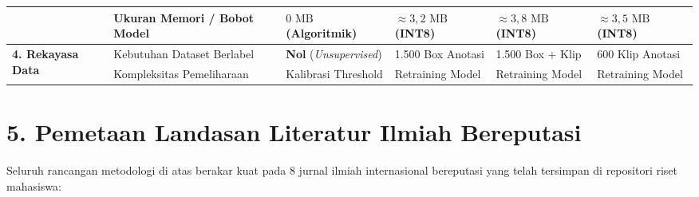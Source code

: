 \documentclass[10pt,a4paper]{article}
\providecommand{\text}[1]{\mbox{#1}}
\begin{document}
{\begin{center}
\begin{tabular}{|p{3.8cm}|p{4.2cm}|p{2.6cm}|p{2.4cm}|p{2.4cm}|p{2.4cm}|}
 & Ukuran Memori / Bobot Model & $0\text{ MB}$ (Algoritmik) & $\approx 3{,}2\text{ MB}$ (INT8) & $\approx 3{,}8\text{ MB}$ (INT8) & $\approx 3{,}5\text{ MB}$ (INT8) \\
\hline
\multirow{2}{*}{\textbf{4. Rekayasa Data}} 
 & Kebutuhan Dataset Berlabel & \textbf{Nol} (\textit{Unsupervised}) & 1.500 Box Anotasi & 1.500 Box + Klip & 600 Klip Anotasi \\
 & Kompleksitas Pemeliharaan & Kalibrasi Threshold & Retraining Model & Retraining Model & Retraining Model \\
\hline
\end{tabular}
\end{center}
}

\newpage


\section*{5. Pemetaan Landasan Literatur Ilmiah Bereputasi}

Seluruh rancangan metodologi di atas berakar kuat pada 8 jurnal ilmiah internasional bereputasi yang telah tersimpan di repositori riset mahasiswa:
\end{document}
